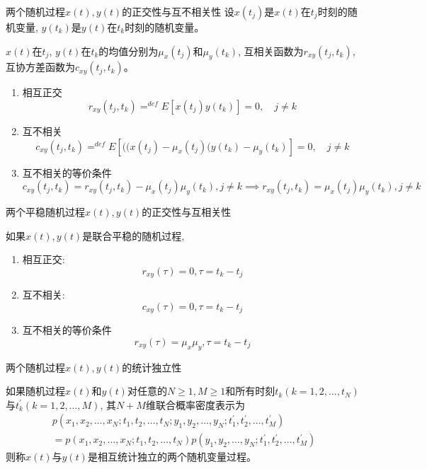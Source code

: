 \begin{frame}{两个随机过程$x(t), y(t)$的正交性与互不相关性}
设$x(t_j)$是$x(t)$在$t_j$时刻的随机变量, $y(t_k)$是$y(t)$在$t_k$时刻的随机变量。
\begin{definition}
	$x(t)$在$t_j$, $y(t)$在$t_k$的均值分别为$\mu_x(t_j)$和$\mu_y(t_k)$, 互相关函数为$r_{xy}(t_j,t_k)$, 互协方差函数为$c_{xy}(t_j,t_k)$。
	\begin{enumerate}
		\item 相互正交
		$$r_{xy}(t_j,t_k)\mathop{=}^{def}E[x(t_j)y(t_k)]=0, \quad j\ne k$$
		\item 互不相关
		$$c_{xy}(t_j,t_k)\mathop{=}^{def}E[((x(t_j)-\mu_x(t_j)(y(t_k)-\mu_y(t_k)]=0, \quad j\ne k$$
		\item 互不相关的等价条件
		$$c_{xy}(t_j,t_k)=r_{xy}(t_j,t_k)-\mu_x(t_j)\mu_y(t_k), j\ne k \implies r_{xy}(t_j,t_k)=\mu_x(t_j)\mu_y(t_k),j\ne k $$
	\end{enumerate}	
\end{definition}
\end{frame}

\begin{frame}{两个平稳随机过程$x(t), y(t)$的正交性与互相关性}
\begin{definition}[]
	如果$x(t), y(t)$是联合平稳的随机过程,
	\begin{enumerate}
		\item 相互正交:
		\[r_{xy}(\tau)=0,\tau=t_k-t_j\]
		\item 互不相关:
		\[c_{xy}(\tau)=0,\tau=t_k-t_j\]
		\item
		互不相关的等价条件
		\[r_{xy}(\tau)=\mu_x\mu_y,\tau=t_k-t_j\]
	\end{enumerate}
\end{definition}
\end{frame}

\begin{frame}{两个随机过程$x(t), y(t)$的统计独立性}
\begin{definition}
	如果随机过程$x(t)$和$y(t)$对任意的$N\ge 1, M\ge 1$和所有时刻$t_k(k=1,2,\dots,t_N)$与$t_k^\prime(k=1,2,\dots,M)$, 其$N+M$维联合概率密度表示为
	\begin{align*}
	p(x_1,x_2,\dots,x_N; t_1,t_2,\dots,t_N; y_1,y_2,\dots,y_N; t_1^\prime,t_2^\prime,\dots,t_M^\prime)\\
	=p(x_1,x_2,\dots,x_N; t_1,t_2,\dots,t_N)p(y_1,y_2,\dots,y_N; t_1^\prime,t_2^\prime,\dots,t_M^\prime)
	\end{align*}
	则称$x(t)$与$y(t)$是相互统计独立的两个随机变量过程。
\end{definition}
\end{frame}

